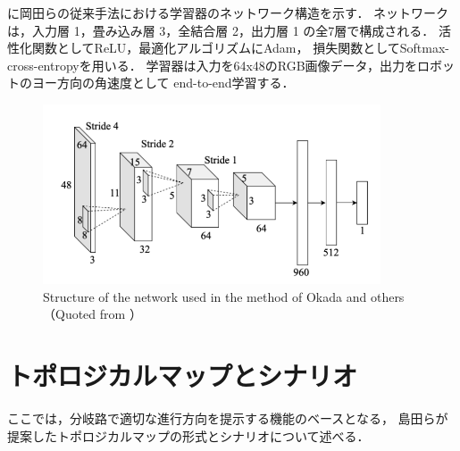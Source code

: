 に岡田らの従来手法における学習器のネットワーク構造を示す．
ネットワークは，入力層 1，畳み込み層 3，全結合層 2，出力層 1 の全7層で構成される．
活性化関数としてReLU\cite{relu}，最適化アルゴリズムにAdam\cite{adam}，
損失関数としてSoftmax-cross-entropyを用いる．
学習器は入力を64x48のRGB画像データ，出力をロボットのヨー方向の角速度として
end-to-end学習する．
\begin{figure}[htbp]
    \centering
     \includegraphics[width=100mm]{images/pdf/okada_network.pdf}
     \caption[Structure of the network used in the method of Okada and others]{Structure of the network used in the method of Okada and others（Quoted from \cite{okada2020}）}
     \label{fig:okada_net}
\end{figure}

\clearpage
\section{トポロジカルマップとシナリオ}
\label{sec:shimada_topo_sce}
ここでは，分岐路で適切な進行方向を提示する機能のベースとなる，
島田ら\cite{shimada2020}が提案したトポロジカルマップの形式とシナリオについて述べる．
